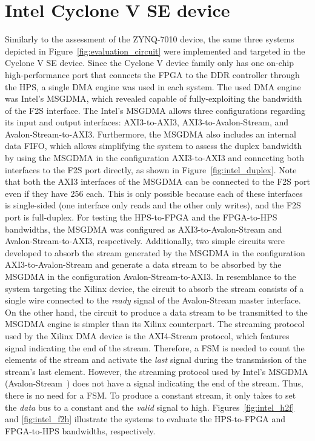 \section{Intel Cyclone V SE device}\label{sec:intel}

Similarly to the assessment of the ZYNQ-7010 device, the same three systems depicted in Figure~\ref{fig:evaluation_circuit} were implemented and targeted in the Cyclone V SE device. Since the Cyclone V device family only has one on-chip high-performance port that connects the \ac{FPGA} to the DDR controller through the \ac{HPS}, a single \ac{DMA} engine was used in each system. The used \ac{DMA} engine was Intel's \ac{MSGDMA}, which revealed capable of fully-exploiting the bandwidth of the \ac{F2S} interface. The Intel's \ac{MSGDMA} allows three configurations regarding its input and output interfaces: AXI3-to-AXI3, AXI3-to-Avalon-Stream, and Avalon-Stream-to-AXI3. Furthermore, the \ac{MSGDMA} also includes an internal data \ac{FIFO}, which allows simplifying the system to assess the duplex bandwidth by using the \ac{MSGDMA} in the configuration AXI3-to-AXI3 and connecting both interfaces to the \ac{F2S} port directly, as shown in Figure~\ref{fig:intel_duplex}. Note that both the AXI3 interfaces of the \ac{MSGDMA} can be connected to the \ac{F2S} port even if they have \SI{256}{\bit} each. This is only possible because each of these interfaces is single-sided (one interface only reads and the other only writes), and the \ac{F2S} port is full-duplex. For testing the \ac{HPS}-to-\ac{FPGA} and the \ac{FPGA}-to-\ac{HPS} bandwidths, the \ac{MSGDMA} was configured as AXI3-to-Avalon-Stream and Avalon-Stream-to-AXI3, respectively. Additionally, two simple circuits were developed to absorb the stream generated by the \ac{MSGDMA} in the configuration AXI3-to-Avalon-Stream and generate a data stream to be absorbed by the \ac{MSGDMA} in the configuration Avalon-Stream-to-AXI3. In resemblance to the system targeting the Xilinx device, the circuit to absorb the stream consists of a single wire connected to the \textit{ready} signal of the Avalon-Stream master interface. On the other hand, the circuit to produce a data stream to be transmitted to the \ac{MSGDMA} engine is simpler than its Xilinx counterpart. The streaming protocol used by the Xilinx \ac{DMA} device is the AXI4-Stream protocol, which features signal indicating the end of the stream. Therefore, a \ac{FSM} is needed to count the elements of the stream and activate the \textit{last} signal during the transmission of the stream's last element. However, the streaming protocol used by Intel's \ac{MSGDMA} (Avalon-Stream~\cite{intel2020avalon}) does not have a signal indicating the end of the stream. Thus, there is no need for a \ac{FSM}. To produce a constant stream, it only takes to set the \textit{data} bus to a constant and the \textit{valid} signal to high. Figures~\ref{fig:intel_h2f} and \ref{fig:intel_f2h} illustrate the systems to evaluate the \ac{HPS}-to-\ac{FPGA} and \ac{FPGA}-to-\ac{HPS} bandwidths, respectively.

